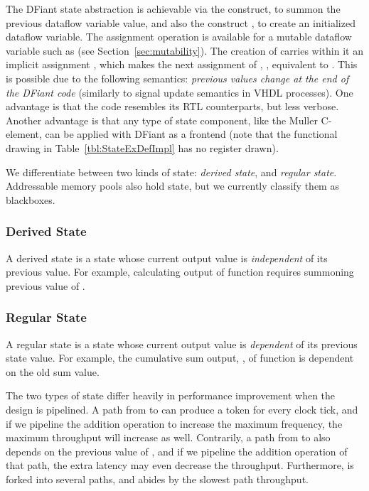 The DFiant state abstraction is achievable via the  construct, to summon the previous dataflow variable value, and also the construct , to create an initialized dataflow variable. The \code{:=} assignment operation is available for a mutable dataflow variable such as  (see Section~\ref{sec:mutability}). The creation of  carries within it an implicit assignment , which makes the next assignment of , , equivalent to . This is possible due to the following semantics: \textit{previous values change at the end of the DFiant code} (similarly to signal update semantics in VHDL processes). One advantage is that the code resembles its RTL counterparts, but less verbose. Another advantage is that any type of state component, like the Muller C-element\cite{muller1957theory}, can be applied with DFiant as a frontend (note that the functional drawing in Table~\ref{tbl:StateExDefImpl} has no register drawn).


We differentiate between two kinds of state: \textit{derived state}, and \textit{regular state}. Addressable memory pools also hold state, but we currently classify them as blackboxes. %

\subsubsection{Derived State} 
A derived state is a state whose current output value is \textit{independent} of its previous value. For example, calculating output  of function  requires summoning previous value of . 

\subsubsection{Regular State} 
A regular state is a state whose current output value is \textit{dependent} of its previous state value. For example, the cumulative sum output, , of function  is dependent on the old sum value. 

The two types of state differ heavily in performance improvement when the design is pipelined. A path from  to  can produce a token for every clock tick, and if we pipeline the addition operation to increase the maximum frequency, the maximum throughput will increase as well. Contrarily, a path from  to  also depends on the previous value of , and if we pipeline the addition operation of that path, the extra latency may even decrease the throughput. Furthermore,  is forked into several paths, and  abides by the slowest path throughput. 

